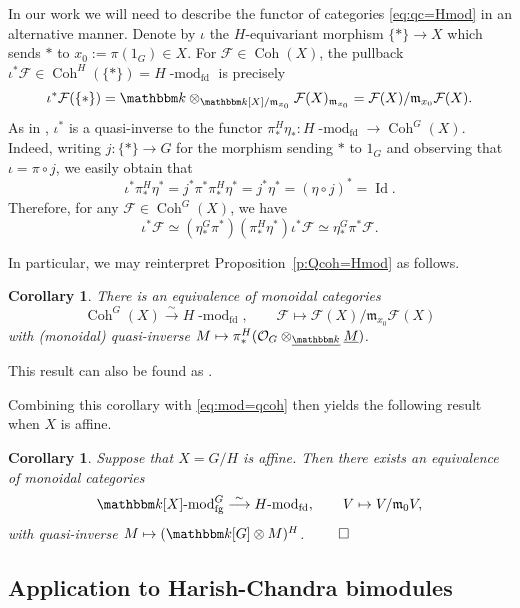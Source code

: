 \documentclass[twoside,12pt,reqno]{amsart}
\newtheorem{Corollary}[Theorem]{Corollary}
\theoremstyle{remark}
\numberwithin{equation}{section}
\def\isoto{\overset{\sim}{\longrightarrow}}
\def\k{{\mathbbm k}}
\def\lmod{\!\operatorname{-mod}}
\def\Id{\operatorname{Id}}
\def\Coh{\operatorname{Coh}}
\def\m{\mathfrak m}
\def\cF{\mathcal{F}}
\def\Oc{\mathcal{O}}
\newcommand{\fg}{\operatorname{fg}}
\newcommand{\fd}{\operatorname{fd}}
\begin{document}
In our work we will need to describe the functor of categories \eqref{eq:qc=Hmod} in an alternative manner. Denote by $\iota$ the $H$-equivariant morphism $\{\ast\}\to X$ which sends $\ast$ to $x_0:=\pi(1_G) \in X$. For $\cF\in\Coh(X)$, the pullback $\iota^*\cF\in \Coh^H(\{\ast\})=H\lmod_{\fd}$ is precisely
\begin{eqnarray}
    \iota^*\cF(\{\ast\})=\k\otimes_{\k[X]/\m_{x_0}} \cF(X)_{\m_{x_0}}=\cF(X)/\m_{x_0}\cF(X).
\end{eqnarray} 
As in \cite[Lemma 2.4]{Br}, $\iota^*$ is a quasi-inverse to the functor $\pi_*^H\eta_*:H\lmod_{\fd}\to\Coh^G(X)$. Indeed, writing $j:\{\ast\}\to G$ for the morphism sending $\ast$ to $1_G$ and observing that $\iota=\pi\circ j$, we easily obtain that $$\iota^*\pi_*^H\eta^*=j^*\pi^*\pi_*^H\eta^*=j^*\eta^*=(\eta\circ j)^*=\Id.$$ Therefore, for any $\cF\in\Coh^G(X)$, we have $$\iota^*\cF\simeq(\eta_*^G \pi^*)(\pi_*^H\eta^*)\iota^*\cF\simeq \eta_*^G\pi^*\cF.$$ 

In particular, we may reinterpret Proposition~\ref{p:Qcoh=Hmod} as follows.
\begin{Corollary}\label{c:kXmod=Hmod}
There is an equivalence of monoidal categories \begin{equation}\label{eq:qc=Hmodv2}
\Coh^G(X)\isoto H\lmod_{\fd}, \qquad \cF\mapsto \cF(X)/\m_{x_0}\cF(X)
\end{equation} with (monoidal) quasi-inverse $M\mapsto \pi_*^H(\Oc_G\otimes_{\underline{\k}}\underline{M})$. 
\end{Corollary}
This result can also be found as \cite[Theorem 2.7, Corollary 2.10]{CPS}.

Combining this corollary with \eqref{eq:mod=qcoh} then yields the following result when $X$ is affine.

\begin{Corollary}\label{c:kXmod=Hmodv2}
    Suppose that $X=G/H$ is affine. Then there exists an equivalence of monoidal categories
    \begin{equation}\label{eq:kXmodG=Hmodv2}
    \k[X]\lmod^G_{\fg}\isoto H\lmod_{\fd},\qquad V\mapsto V/\m_0 V,  
    \end{equation} with quasi-inverse $M\mapsto (\k[G]\otimes M)^H$. $\hfill\qed$
\end{Corollary}

\subsection{Application to Harish-Chandra bimodules}
\label{ss:applicationtoHCbimodules}
\end{document}
